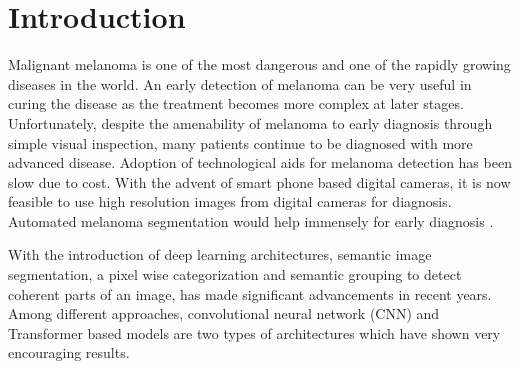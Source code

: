 \section{Introduction}

Malignant melanoma is one of the most dangerous and one of the rapidly growing diseases in the world. An early detection of melanoma can be very useful in curing the disease as the treatment becomes more complex at later stages. Unfortunately, despite the amenability of melanoma to early diagnosis through simple visual inspection, many patients continue to be diagnosed with more advanced disease. Adoption of technological aids for melanoma detection has been slow due to cost. With the advent of smart phone based digital cameras, it is now feasible to use high resolution images from digital cameras for diagnosis. Automated melanoma segmentation would help immensely for early diagnosis \citep{ensambles-2016-codella}.

\par
With the introduction of deep learning architectures, semantic image segmentation, a pixel wise categorization and semantic grouping to detect coherent parts of an image, has made significant advancements in recent years. Among different approaches, convolutional neural network (CNN) and Transformer based models are two types of architectures which have shown very encouraging results.


